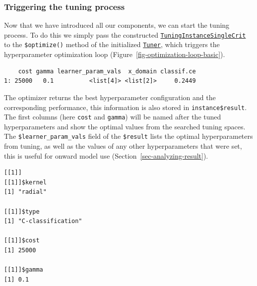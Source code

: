 \hypertarget{triggering-the-tuning-process}{%
\subsubsection*{Triggering the tuning
process}\label{triggering-the-tuning-process}}

Now that we have introduced all our components, we can start the tuning
process. To do this we simply pass the constructed
\href{https://mlr3tuning.mlr-org.com/reference/TuningInstanceSingleCrit.html}{\texttt{TuningInstanceSingleCrit}}
to the \texttt{\$optimize()} method of the initialized
\href{https://mlr3tuning.mlr-org.com/reference/Tuner.html}{\texttt{Tuner}},
which triggers the hyperparameter optimization loop
(Figure~\ref{fig-optimization-loop-basic}).

\begin{Shaded}
\begin{Highlighting}[]
\SpecialCharTok{$}
\end{Highlighting}
\end{Shaded}

\begin{verbatim}
    cost gamma learner_param_vals  x_domain classif.ce
1: 25000   0.1          <list[4]> <list[2]>     0.2449
\end{verbatim}

The optimizer returns the best hyperparameter configuration and the
corresponding performance, this information is also stored in
\texttt{instance\$result}. The first columns (here \texttt{cost} and
\texttt{gamma}) will be named after the tuned hyperparameters and show
the optimal values from the searched tuning spaces. The
\texttt{\$learner\_param\_vals} field of the \texttt{\$result} lists the
optimal hyperparameters from tuning, as well as the values of any other
hyperparameters that were set, this is useful for onward model use
(Section~\ref{sec-analyzing-result}).

\begin{Shaded}
\begin{Highlighting}[]
\SpecialCharTok{$}\SpecialCharTok{$}
\end{Highlighting}
\end{Shaded}

\begin{verbatim}
[[1]]
[[1]]$kernel
[1] "radial"

[[1]]$type
[1] "C-classification"

[[1]]$cost
[1] 25000

[[1]]$gamma
[1] 0.1
\end{verbatim}

